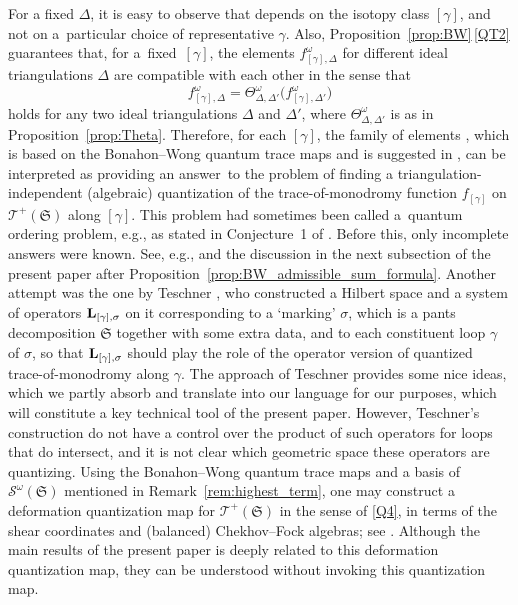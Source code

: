 \documentclass[10pt,a4paper]{amsart}
\numberwithin{equation}{section}
\theoremstyle{definition}
\begin{document}
For a fixed $\Delta$, it is easy to observe that  depends on the isotopy class $[\gamma]$, and not on a~particular choice of representative $\gamma$. Also, Proposition~\ref{prop:BW}\,\ref{QT2} guarantees that, for a~fixed~$[\gamma]$, the elements $f^\omega_{[\gamma],\Delta}$ for different ideal triangulations $\Delta$ are compatible with each other in the sense that
\[
f^\omega_{[\gamma],\Delta} = \Theta^\omega_{\Delta,\Delta'}\bigl(f^\omega_{[\gamma],\Delta'}\bigr)
\]
holds for any two ideal triangulations $\Delta$ and $\Delta'$, where $\Theta^\omega_{\Delta,\Delta'}$ is as in Proposition~\ref{prop:Theta}. Therefore, for each $[\gamma]$, the family of elements , which is based on the Bonahon--Wong quantum trace maps \cite{BW} and is suggested in \cite{AK}, can be interpreted as providing an answer~to the problem of finding a triangulation-independent (algebraic) quantization of the trace-of-monodromy function $f_{[\gamma]}$ on $\mathscr{T}^+(\mathfrak{S})$ along $[\gamma]$. This problem had sometimes been called a~quantum ordering problem, e.g., as stated in Conjecture~1 of \cite{CF2}.
Before this, only incomplete answers were known. See, e.g., \cite{F97, CF2} and the discussion in the next subsection of the present paper after Proposition~\ref{prop:BW_admissible_sum_formula}. Another attempt was the one by Teschner \cite{T}, who constructed a Hilbert space and a system of operators ${\bf L}_{[\gamma],\sigma}$ on it corresponding to a `marking' $\sigma$, which is a pants decomposition $\mathfrak{S}$ together with some extra data, and to each constituent loop $\gamma$ of $\sigma$, so that ${\bf L}_{[\gamma],\sigma}$ should play the role of the operator version of quantized trace-of-monodromy along $\gamma$. The approach of Teschner provides some nice ideas, which we partly absorb and translate into our language for our purposes, which will constitute a key technical tool of the present paper. However, Teschner's construction do not have a control over the product of such operators for loops that do intersect, and it is not clear which geometric space these operators are quantizing.
Using the Bonahon--Wong quantum trace maps and a basis of $\mathcal{S}^\omega(\mathfrak{S})$ mentioned in Remark~\ref{rem:highest_term}, one may construct a deformation quantization map for $\mathscr{T}^+(\mathfrak{S})$ in the sense of \ref{Q4}, in terms of the shear coordinates and (balanced) Chekhov--Fock algebras; see \cite{AK,CKKO,KS}. Although the main results of the present paper is deeply related to this deformation quantization map, they can be understood without invoking this quantization map.
\end{document}
